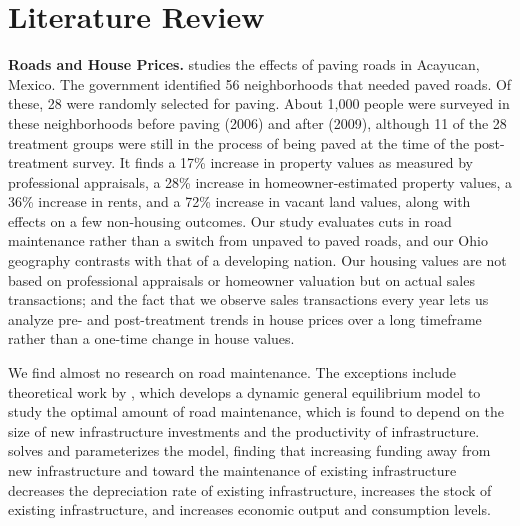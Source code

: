 \section{Literature Review}

{\bf Roads and House Prices.} \cite{gonzalez2016paving} studies the effects of paving roads in Acayucan, Mexico. The government identified 56 neighborhoods that needed paved roads. Of these, 28 were randomly selected for paving.  About 1,000 people were surveyed in these neighborhoods before paving (2006) and after (2009), although 11 of the 28 treatment groups were still in the process of being paved at the time of the post-treatment survey.  It finds a 17\% increase in property values as measured by professional appraisals, a 28\% increase in homeowner-estimated property values, a 36\% increase in rents, and a 72\% increase in vacant land values, along with effects on a few non-housing outcomes.  Our study evaluates cuts in road maintenance rather than a switch from unpaved to paved roads, and our Ohio geography contrasts with that of a developing nation.  Our housing values are not based on professional appraisals or homeowner valuation but on actual sales transactions; and the fact that we observe sales transactions every year lets us analyze pre- and post-treatment trends in house prices over a long timeframe rather than a one-time change in house values. 


We find almost no research on road maintenance. The exceptions include theoretical work by \cite{rioja2003}, which develops a dynamic general equilibrium model to study the optimal amount of road maintenance, which is found to depend on the size of new infrastructure investments and the productivity of infrastructure. \cite{rioja2003} solves and parameterizes the model, finding that increasing funding away from new infrastructure and toward the maintenance of existing infrastructure decreases the depreciation rate of existing infrastructure, increases the stock of existing infrastructure, and increases economic output and consumption levels. 
 
